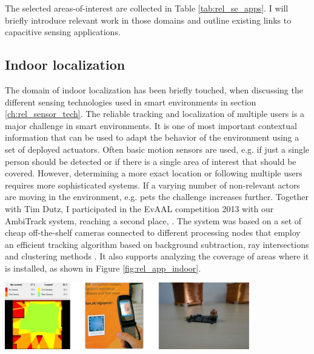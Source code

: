 The selected areas-of-interest are collected in Table \ref{tab:rel_se_apps}. I will briefly introduce relevant work in those domains and outline existing links to capacitive sensing applications. 

\subsection{Indoor localization}
The domain of indoor localization has been briefly touched, when discussing the different sensing technologies used in smart environments in section \ref{ch:rel_sensor_tech}. The reliable tracking and localization of multiple users is a major challenge in smart environments. It is one of most important contextual information that can be used to adapt the behavior of the environment using a set of deployed actuators. Often basic motion sensors are used, e.g. if just a single person should be detected or if there is a single area of interest that should be covered. However, determining a more exact location or following multiple users requires more sophisticated systems. If a varying number of non-relevant actors are moving in the environment, e.g. pets the challenge increases further. Together with Tim Dutz, I participated in the EvAAL competition 2013 with our AmbiTrack system, reaching a second place, \cite{braun2013ambitrack}. The system was based on a set of cheap off-the-shelf cameras connected to different processing nodes that employ an efficient tracking algorithm based on background subtraction, ray intersections and clustering methods \cite{Braun2013MarkerFree}. It also supports analyzing the coverage of areas where it is installed, as shown in Figure \ref{fig:rel_app_indoor}.

\begin{minipage}{\linewidth}
\centering
\includegraphics[width=0.8\textwidth]{images/rel_app_indoor}
\label{fig:rel_app_indoor}
\end{minipage}	


